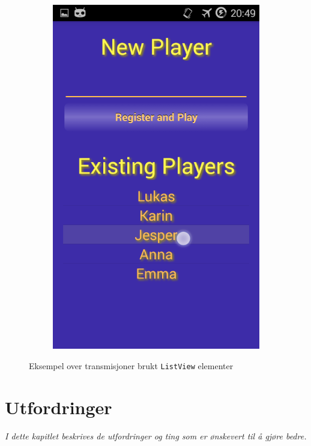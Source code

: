 \begin{figure}[float]
\begin{subfigure}[b]{0.25\textwidth}
        \includegraphics[width=\textwidth]{./img/design/d2.png}
    \end{subfigure}
    \caption{Eksempel over transmisjoner brukt \texttt{ListView} elementer}
    \label{fig:design_trans}
\end{figure}


\chapter{Utfordringer}
\emph{I dette kapitlet beskrives de utfordringer og ting som er ønskevert til å gjøre bedre.}

